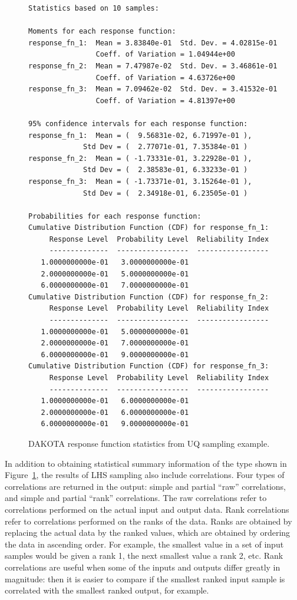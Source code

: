 \begin{figure}
\centering
\begin{bigbox}
\begin{small}
\begin{verbatim}
Statistics based on 10 samples:

Moments for each response function:
response_fn_1:  Mean = 3.83840e-01  Std. Dev. = 4.02815e-01
                Coeff. of Variation = 1.04944e+00
response_fn_2:  Mean = 7.47987e-02  Std. Dev. = 3.46861e-01
                Coeff. of Variation = 4.63726e+00
response_fn_3:  Mean = 7.09462e-02  Std. Dev. = 3.41532e-01
                Coeff. of Variation = 4.81397e+00

95% confidence intervals for each response function:
response_fn_1:  Mean = (  9.56831e-02, 6.71997e-01 ),
             Std Dev = (  2.77071e-01, 7.35384e-01 )
response_fn_2:  Mean = ( -1.73331e-01, 3.22928e-01 ),
             Std Dev = (  2.38583e-01, 6.33233e-01 )
response_fn_3:  Mean = ( -1.73371e-01, 3.15264e-01 ),
             Std Dev = (  2.34918e-01, 6.23505e-01 )

Probabilities for each response function:
Cumulative Distribution Function (CDF) for response_fn_1:
     Response Level  Probability Level  Reliability Index
     --------------  -----------------  -----------------
   1.0000000000e-01   3.0000000000e-01
   2.0000000000e-01   5.0000000000e-01
   6.0000000000e-01   7.0000000000e-01
Cumulative Distribution Function (CDF) for response_fn_2:
     Response Level  Probability Level  Reliability Index
     --------------  -----------------  -----------------
   1.0000000000e-01   5.0000000000e-01
   2.0000000000e-01   7.0000000000e-01
   6.0000000000e-01   9.0000000000e-01
Cumulative Distribution Function (CDF) for response_fn_3:
     Response Level  Probability Level  Reliability Index
     --------------  -----------------  -----------------
   1.0000000000e-01   6.0000000000e-01
   2.0000000000e-01   6.0000000000e-01
   6.0000000000e-01   9.0000000000e-01
\end{verbatim}
\end{small}
\end{bigbox}
\caption{DAKOTA response function statistics from UQ sampling example.}
\label{uq:figure03}
\end{figure}

In addition to obtaining statistical summary information of the type
shown in Figure~\ref{uq:figure03}, the results of LHS sampling also
include correlations.  Four types of correlations are returned in the
output: simple and partial ``raw'' correlations, and simple and
partial ``rank'' correlations.  The raw correlations refer to
correlations performed on the actual input and output data.  Rank
correlations refer to correlations performed on the ranks of the data.
Ranks are obtained by replacing the actual data by the ranked values,
which are obtained by ordering the data in ascending order.  For
example, the smallest value in a set of input samples would be given a
rank 1, the next smallest value a rank 2, etc.  Rank correlations are
useful when some of the inputs and outputs differ greatly in
magnitude: then it is easier to compare if the smallest ranked input
sample is correlated with the smallest ranked output, for example.


